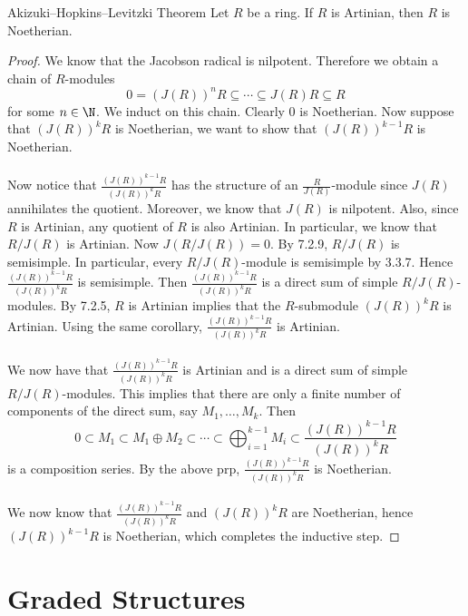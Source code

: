 \documentclass[a4paper]{article}
\begin{document}
\begin{thm}{Akizuki–Hopkins–Levitzki Theorem}{} Let $R$ be a ring. If $R$ is Artinian, then $R$ is Noetherian. \tcbline
\begin{proof}
We know that the Jacobson radical is nilpotent. Therefore we obtain a chain of $R$-modules $$0=(J(R))^nR\subseteq\cdots\subseteq J(R)R\subseteq R$$ for some $n\in\N$. We induct on this chain. Clearly $0$ is Noetherian. Now suppose that $(J(R))^kR$ is Noetherian, we want to show that $(J(R))^{k-1}R$ is Noetherian. \\~\\

Now notice that $\frac{(J(R))^{k-1}R}{(J(R))^kR}$ has the structure of an $\frac{R}{J(R)}$-module since $J(R)$ annihilates the quotient. Moreover, we know that $J(R)$ is nilpotent. Also, since $R$ is Artinian, any quotient of $R$ is also Artinian. In particular, we know that $R/J(R)$ is Artinian. Now $J(R/J(R))=0$. By 7.2.9, $R/J(R)$ is semisimple. In particular, every $R/J(R)$-module is semisimple by 3.3.7. Hence $\frac{(J(R))^{k-1}R}{(J(R))^kR}$ is semisimple. Then $\frac{(J(R))^{k-1}R}{(J(R))^kR}$ is a direct sum of simple $R/J(R)$-modules. By 7.2.5, $R$ is Artinian implies that the $R$-submodule $(J(R))^kR$ is Artinian. Using the same corollary, $\frac{(J(R))^{k-1}R}{(J(R))^kR}$ is Artinian. \\~\\

We now have that $\frac{(J(R))^{k-1}R}{(J(R))^kR}$ is Artinian and is a direct sum of simple $R/J(R)$-modules. This implies that there are only a finite number of components of the direct sum, say $M_1,\dots,M_k$. Then $$0\subset M_1\subset M_1\oplus M_2\subset\cdots\subset\bigoplus_{i=1}^{k-1}M_i\subset\frac{(J(R))^{k-1}R}{(J(R))^kR}$$ is a composition series. By the above prp, $\frac{(J(R))^{k-1}R}{(J(R))^kR}$ is Noetherian. \\~\\

We now know that $\frac{(J(R))^{k-1}R}{(J(R))^kR}$ and $(J(R))^kR$ are Noetherian, hence $(J(R))^{k-1}R$ is Noetherian, which completes the inductive step. 
\end{proof}
\end{thm}

\pagebreak
\section{Graded Structures}
\end{document}
